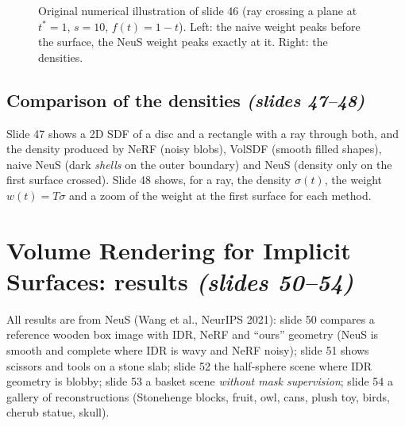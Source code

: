 \documentclass[11pt,a4paper]{article}
\theoremstyle{definition}
\theoremstyle{plain}
\theoremstyle{remark}
\begin{document}
\begin{figure}[htbp]
\begin{minipage}{0.49\linewidth}
\end{minipage}
\caption{Original numerical illustration of slide 46 (ray crossing a plane at $t^*=1$, $s=10$, $f(t)=1-t$). Left: the naive weight peaks
before the surface, the NeuS weight peaks exactly at it. Right: the densities.}
\end{figure}

\subsection{Comparison of the densities \emph{(slides 47--48)}}
Slide 47 shows a 2D SDF of a disc and a rectangle with a ray through both, and the density produced by NeRF
(noisy blobs), VolSDF (smooth filled shapes), naive NeuS (dark \emph{shells} on the outer boundary) and NeuS (density only on the
first surface crossed). Slide 48 shows, for a ray, the density $\sigma(t)$, the weight $w(t)=T\sigma$ and a zoom of the weight at the first surface for each method.


\section{Volume Rendering for Implicit Surfaces: results \emph{(slides 50--54)}}
All results are from NeuS (Wang et al., NeurIPS 2021): slide 50 compares a reference wooden box image with IDR, NeRF and ``ours'' geometry
(NeuS is smooth and complete where IDR is wavy and NeRF noisy); slide 51 shows scissors and tools on a stone slab; slide 52 the half-sphere scene
where IDR geometry is blobby; slide 53 a basket scene \emph{without mask supervision}; slide 54 a gallery of reconstructions (Stonehenge blocks, fruit, owl, cans, plush toy, birds,
cherub statue, skull).

\end{document}
